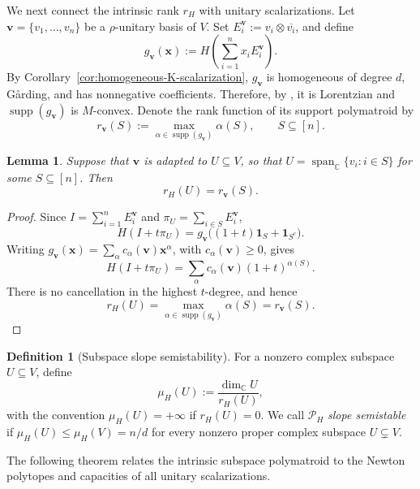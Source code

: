 \documentclass[oneside,english,letterpaper]{amsart}
\numberwithin{equation}{section}
\theoremstyle{plain}
\newtheorem{lem}[thm]{Lemma}
\theoremstyle{definition}
\newtheorem{defn}[thm]{Definition}
\theoremstyle{remark}
\def\v{\mathbf{v}}
\def\one{\mathbf{1}}
\begin{document}
We next connect the intrinsic rank \(r_H\) with unitary
scalarizations. Let   \( \v=\{v_1,\ldots,v_n\}\) be a \(\rho\)-unitary basis of \(V\). Set
\(E_i^{\mathbf v}:=v_i\otimes\overline{v_i}\), and define
\begin{equation}
g_{\mathbf v}(\mathbf x)
:=
H\left(\sum_{i=1}^n x_iE_i^{\mathbf v}\right).
\label{eq:unitary-scalarization-H}
\end{equation}
By Corollary~\ref{cor:homogeneous-K-scalarization},
\(g_{\mathbf v}\) is homogeneous of degree \(d\), G{\aa}rding, and
has nonnegative coefficients. Therefore, by \cite{Fang-MaGard}, it is Lorentzian and
\(\operatorname{supp}(g_{\mathbf v})\) is \(M\)-convex. Denote
the rank function of its support polymatroid by
\[
r_{\mathbf v}(S)
:=
\max_{\alpha\in\operatorname{supp}(g_{\mathbf v})}\alpha(S),
\qquad
S\subseteq[n].
\]
\begin{lem}
\label{lem:adapted-frame-rank}
Suppose that \(\mathbf v\) is adapted to \(U\subseteq V\), so that
\(U=\operatorname{span}_{\mathbb C}\{v_i:i\in S\}\) for some
\(S\subseteq[n]\). Then
\[
r_H(U)=r_{\mathbf v}(S).
\]
\end{lem}
\begin{proof}
Since \(I=\sum_{i=1}^nE_i^{\mathbf v}\) and
\(\pi_U=\sum_{i\in S}E_i^{\mathbf v}\),
\[
H(I+t\pi_U)
=
g_{\mathbf v}\bigl((1+t)\one_S+\one_{S^c}\bigr).
\]
Writing
\(g_{\mathbf v}(\mathbf x)
=\sum_\alpha c_\alpha(\mathbf v)\mathbf x^\alpha\), with
\(c_\alpha(\mathbf v)\geq 0\), gives
\[
H(I+t\pi_U)
=
\sum_\alpha
c_\alpha(\mathbf v)(1+t)^{\alpha(S)}.
\]
There is no cancellation in the highest \(t\)-degree, and hence
\[
r_H(U)
=
\max_{\alpha\in\operatorname{supp}(g_{\mathbf v})}\alpha(S)
=
r_{\mathbf v}(S).
\]
\end{proof}
\begin{defn}[Subspace slope semistability]
\label{def:subspace-slope-semistability}
For a nonzero complex subspace \(U\subseteq V\), define
\[
\mu_H(U):=\frac{\dim_{\mathbb C}U}{r_H(U)},
\]
with the convention \(\mu_H(U)=+\infty\) if \(r_H(U)=0\). We call
\(\mathcal P_H\) \emph{slope semistable} if
\(\mu_H(U)\leq\mu_H(V)=n/d\) for every nonzero proper complex
subspace \(U\subsetneq V\).
\end{defn}
The following theorem relates the intrinsic subspace polymatroid to
the Newton polytopes and capacities of all unitary scalarizations.
\end{document}
